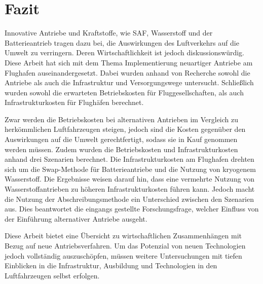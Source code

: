 \chapter{Fazit}
\label{ch:Fazit}
Innovative Antriebe und Kraftstoffe, wie SAF, Wasserstoff und der Batterieantrieb tragen dazu bei, die Auswirkungen des Luftverkehrs auf die Umwelt zu verringern.
Deren Wirtschaftlichkeit ist jedoch diskussionswürdig.
Diese Arbeit hat sich mit dem Thema Implementierung neuartiger Antriebe am Flughafen auseinandergesetzt. 
Dabei wurden anhand von Recherche sowohl die Antriebe als auch die Infrastruktur und Versorgungswege untersucht.
Schließlich wurden sowohl die erwarteten Betriebskosten für Fluggesellschaften, als auch Infrastrukturkosten für Flughäfen berechnet.

Zwar werden die Betriebskosten bei alternativen Antrieben im Vergleich zu herkömmlichen Luftfahrzeugen steigen, 
jedoch sind die Kosten gegenüber den Auswirkungen auf die Umwelt gerechtfertigt, sodass sie in Kauf genommen werden müssen.
Zudem wurden die Betriebskosten und Infrastrukturkosten anhand drei Szenarien berechnet. 
Die Infrastrukturkosten am Flughafen drehten sich um die Swap-Methode für Batterieantriebe 
und die Nutzung von kryogenem Wasserstoff.
Die Ergebnisse weisen darauf hin, dass eine vermehrte Nutzung von Wasserstoffantrieben zu 
höheren Infrastrukturkosten führen kann.
Jedoch macht die Nutzung der Abschreibungsmethode ein Unterschied zwischen den Szenarien aus. 
Dies beantwortet die eingangs gestellte Forschungsfrage, welcher Einfluss von der Einführung alternativer Antriebe ausgeht.

Diese Arbeit bietet eine Übersicht zu wirtschaftlichen Zusammenhängen mit Bezug auf neue Antriebsverfahren.
Um das Potenzial von neuen Technologien jedoch vollständig auszuschöpfen, müssen weitere Untersuchungen 
mit tiefen Einblicken in die Infrastruktur, Ausbildung und Technologien in den Luftfahrzeugen selbst erfolgen.
